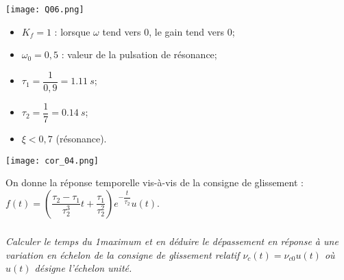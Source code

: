 \begin{multicols}{2}

\ifprof
\else
\begin{center}
\texttt{[image: Q06.png]}
\end{center}
\fi


\ifprof
\begin{corrige}
\end{corrige}
\else
\fi


\ifprof
\begin{corrige}
\begin{itemize}
\item $K_f=1$ : lorsque $\omega$ tend vers 0, le gain tend vers 0;
\item $\omega_0  = 0,5$ : valeur de la pulsation de résonance; 
\item $\tau_1 = \dfrac{1}{0,9}=\SI{1,11}{s}$;
\item $\tau_2 = \dfrac{1}{7} =\SI{0,14}{s}$;
\item $\xi<0,7$ (résonance).
\end{itemize}
\end{corrige}
\else
\fi


\ifprof
\begin{corrige}

\begin{center}
\texttt{[image: cor\_04.png]}
\end{center}
\end{corrige}
\else
\fi

On donne la réponse temporelle vis-à-vis de la consigne de glissement : $f(t)=\left( \dfrac{\tau_2 - \tau_1 }{\tau_2^3 }t +\dfrac{\tau_1}{\tau_2^2} \right)e^{-\dfrac{t}{\tau_2}} u(t)$.




\subparagraph{}\textbf{ \; } \textit{Calculer le temps du 1\ier maximum et en déduire le
dépassement en réponse à une variation en échelon de la consigne de glissement
relatif $\nu_c(t)=\nu_{c0}u(t)$ où $u(t)$ désigne l’échelon unité.}
\ifprof
\begin{corrige}


\end{corrige}
\end{multicols}
